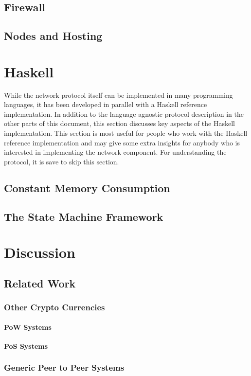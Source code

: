 \documentclass{report}
\theoremstyle{definition}{
  \newtheorem{lemma}{Lemma}[section] %
  \newtheorem{definition}[lemma]{Definition}
}
\theoremstyle{theorem}{
  \newtheorem{invariant}[lemma]{Invariant}
  \newtheorem{proofobligation}[lemma]{Proof Obligation}
}
\numberwithin{equation}{lemma}
\begin{document}
\section{Firewall}
\section{Nodes and Hosting}

\chapter{Haskell}
While the network protocol itself can be implemented in many programming languages,
it has been developed in parallel with a Haskell reference implementation.
In addition to the language agnostic protocol description in the other parts of this document,
this section discusses key aspects of the Haskell implementation.
This section is most useful for people who work with the Haskell reference implementation and
may give some extra insights for anybody who is interested in implementing the
network component.
For understanding the protocol, it is save to skip this section.
\section{Constant Memory Consumption}
\section{The State Machine Framework}
\label{Haskell-state-machine}

\chapter{Discussion}
\section{Related Work}
\subsection{Other Crypto Currencies}
\subsubsection{PoW Systems}
\subsubsection{PoS Systems}
\subsection{Generic Peer to Peer Systems}
\end{document}
